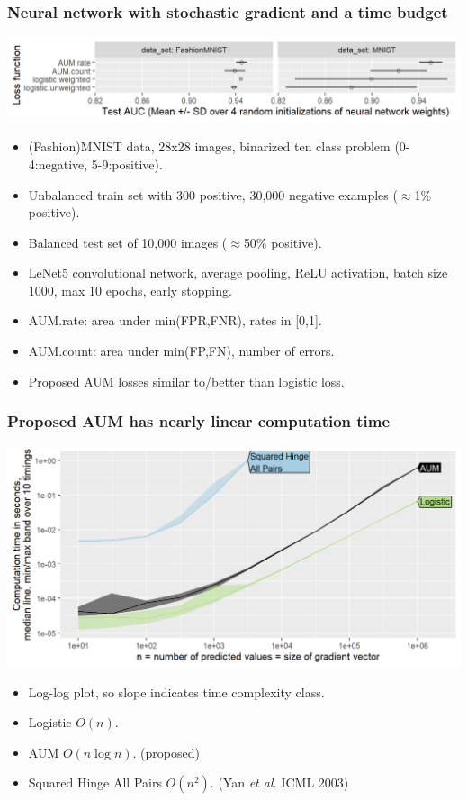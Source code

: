 \documentclass[t]{beamer}
\begin{document}
\begin{frame}
  \frametitle{Neural network with stochastic gradient and a time budget}

 \includegraphics[width=\textwidth]{figure-aum-neural-networks-test-auc.png}

 \begin{itemize}
 \item (Fashion)MNIST data, 28x28 images, binarized ten class problem
   (0-4:negative, 5-9:positive).
 \item Unbalanced train set with 300 positive, 30,000 negative
   examples ($\approx$1\% positive).
 \item Balanced test set of 10,000 images ($\approx$50\% positive).
 \item LeNet5 convolutional network, average pooling, ReLU
   activation, batch size 1000, max 10 epochs, early stopping.
 \item AUM.rate: area under min(FPR,FNR), rates in [0,1].
 \item AUM.count: area under min(FP,FN), number of errors.
 \item Proposed AUM losses similar to/better than logistic loss.
 \end{itemize}

\end{frame}

\begin{frame}
  \frametitle{Proposed AUM has nearly linear computation time}

\includegraphics[width=\textwidth]{figure-aum-grad-speed-binary.png}

\begin{itemize}
  \item Log-log plot, so slope indicates time complexity class.
\item Logistic $O(n)$. 
\item AUM $O(n\log n)$. (proposed)
\item Squared Hinge All Pairs $O(n^2)$. (Yan \emph{et al.} ICML 2003)
\end{itemize}
  
\end{frame}
\end{document}
